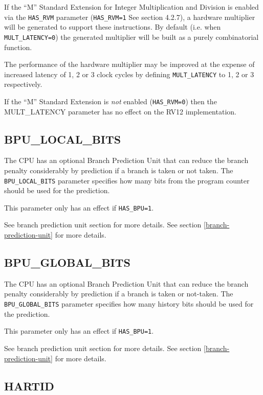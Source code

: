 If the ``M'' Standard Extension for Integer Multiplication and Division is
enabled via the \texttt{HAS\_RVM} parameter (\texttt{HAS\_RVM=1} See
section 4.2.7), a hardware multiplier will be generated to support these
instructions. By default (i.e. when \texttt{MULT\_LATENCY=0}) the generated
multiplier will be built as a purely combinatorial function.

The performance of the hardware multiplier may be improved at the expense of
increased latency of 1, 2 or 3 clock cycles by defining \texttt{MULT\_LATENCY}
to 1, 2 or 3 respectively.

If the ``M'' Standard Extension is \emph{not} enabled (\texttt{HAS\_RVM=0})
then the MULT\_LATENCY parameter has no effect on the RV12
implementation.

\subsection{BPU\_LOCAL\_BITS}\label{bpu_local_bits}

The CPU has an optional Branch Prediction Unit that can reduce the branch
penalty considerably by prediction if a branch is taken or not taken. The
\texttt{BPU\_LOCAL\_BITS} parameter specifies how many bits from the program
counter should be used for the prediction.

This parameter only has an effect if \texttt{HAS\_BPU=1}.

\ifdefined\MARKDOWN
See branch prediction unit section for more details.
\else
See section \ref{branch-prediction-unit}  for more details.
\fi

\subsection{BPU\_GLOBAL\_BITS}\label{bpu_global_bits}

The CPU has an optional Branch Prediction Unit that can reduce the branch
penalty considerably by prediction if a branch is taken or not-taken. The
\texttt{BPU\_GLOBAL\_BITS} parameter specifies how many history bits should be
used for the prediction.

This parameter only has an effect if \texttt{HAS\_BPU=1}.

\ifdefined\MARKDOWN
See branch prediction unit section for more details.
\else
See section \ref{branch-prediction-unit}  for more details.
\fi

\subsection{HARTID}\label{hartid}

